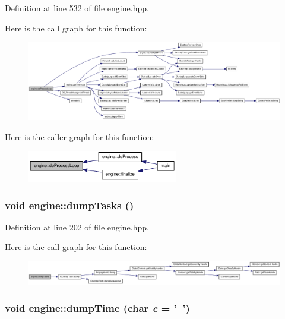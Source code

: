 Definition at line 532 of file engine.hpp.

Here is the call graph for this function:\nopagebreak
\begin{figure}[H]
\begin{center}
\leavevmode
\includegraphics[width=420pt]{classengine_a4e7f59155ec8ac715c490a7006489d76_cgraph}
\end{center}
\end{figure}


Here is the caller graph for this function:\nopagebreak
\begin{figure}[H]
\begin{center}
\leavevmode
\includegraphics[width=186pt]{classengine_a4e7f59155ec8ac715c490a7006489d76_icgraph}
\end{center}
\end{figure}
\hypertarget{classengine_a8e205e47882728401e1b71805ddf802a}{
\subsubsection[{dumpTasks}]{\setlength{\rightskip}{0pt plus 5cm}void engine::dumpTasks ()}}
\label{classengine_a8e205e47882728401e1b71805ddf802a}


Definition at line 202 of file engine.hpp.

Here is the call graph for this function:\nopagebreak
\begin{figure}[H]
\begin{center}
\leavevmode
\includegraphics[width=420pt]{classengine_a8e205e47882728401e1b71805ddf802a_cgraph}
\end{center}
\end{figure}
\hypertarget{classengine_aa53319327cf7350b84bb928214e3dae0}{
\subsubsection[{dumpTime}]{\setlength{\rightskip}{0pt plus 5cm}void engine::dumpTime (char {\em c} = {\ttfamily '~'})}}
\label{classengine_aa53319327cf7350b84bb928214e3dae0}


